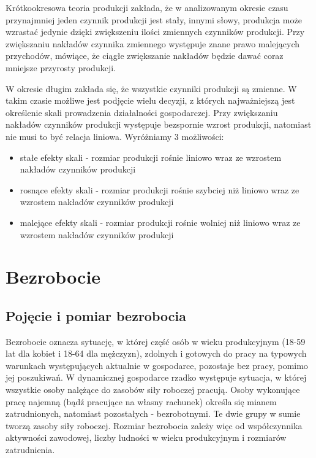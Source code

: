 \documentclass[12pt]{extarticle}
\begin{document}
Krótkookresowa teoria produkcji zakłada, że w analizowanym okresie czasu przynajmniej jeden czynnik produkcji jest stały, innymi słowy, produkcja może wzrastać jedynie dzięki zwiększeniu ilości zmiennych czynników produkcji. Przy zwiększaniu nakładów czynnika zmiennego występuje znane prawo malejących przychodów, mówiące, że ciągłe zwiększanie nakładów będzie dawać coraz mniejsze przyrosty produkcji.

W okresie długim zakłada się, że wszystkie czynniki produkcji są zmienne. W takim czasie możliwe jest podjęcie wielu decyzji, z których najważniejszą jest określenie skali prowadzenia działalności gospodarczej. Przy zwiększaniu nakładów czynników produkcji występuje bezspornie wzrost produkcji, natomiast nie musi to być relacja liniowa. Wyróżniamy 3 możliwości:

\begin{itemize}
	\item stałe efekty skali - rozmiar produkcji rośnie liniowo wraz ze wzrostem nakładów czynników produkcji
	\item rosnące efekty skali - rozmiar produkcji rośnie szybciej niż liniowo wraz ze wzrostem nakładów czynników produkcji
	\item malejące efekty skali - rozmiar produkcji rośnie wolniej niż liniowo wraz ze wzrostem nakładów czynników produkcji
\end{itemize}

\section{Bezrobocie}

\subsection{Pojęcie i pomiar bezrobocia}

Bezrobocie oznacza sytuację, w której część osób w wieku produkcyjnym (18-59 lat dla kobiet i 18-64 dla mężczyzn), zdolnych i gotowych do pracy na typowych warunkach występujących aktualnie w gospodarce, pozostaje bez pracy, pomimo jej poszukiwań. W dynamicznej gospodarce rzadko występuje sytuacja, w której wszystkie osoby nalężące do zasobów siły roboczej pracują. Osoby wykonujące pracę najemną (bądź pracujące na własny rachunek) określa się mianem zatrudnionych, natomiast pozostałych - bezrobotnymi. Te dwie grupy w sumie tworzą zasoby siły roboczej. Rozmiar bezrobocia zależy więc od współczynnika aktywności zawodowej, liczby ludności w wieku produkcyjnym i rozmiarów zatrudnienia.
\end{document}
